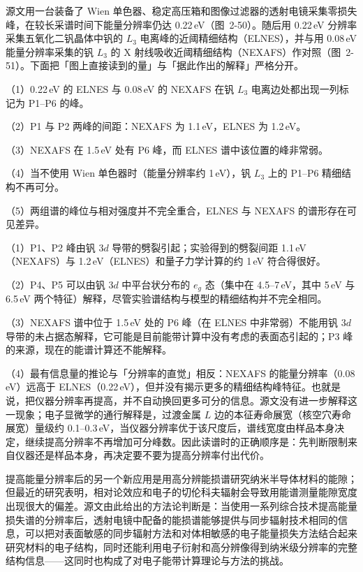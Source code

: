 \begin{example}
源文用一台装备了 Wien 单色器、稳定高压箱和图像过滤器的透射电镜采集零损失峰，在较长采谱时间下能量分辨率仍达 0.22\,eV（图~2-50）。随后用 0.22\,eV 分辨率采集五氧化二钒晶体中钒的 $L_3$ 电离峰的近阈精细结构（ELNES），并与用 0.08\,eV 能量分辨率采集的钒 $L_3$ 的 X 射线吸收近阈精细结构（NEXAFS）作对照（图~2-51）。下面把「图上直接读到的量」与「据此作出的解释」严格分开。

\begin{obs}
（1）0.22\,eV 的 ELNES 与 0.08\,eV 的 NEXAFS 在钒 $L_3$ 电离边处都出现一列标记为 P1--P6 的峰。

（2）P1 与 P2 两峰的间距：NEXAFS 为 1.1\,eV，ELNES 为 1.2\,eV。

（3）NEXAFS 在 1.5\,eV 处有 P6 峰，而 ELNES 谱中该位置的峰非常弱。

（4）当不使用 Wien 单色器时（能量分辨率约 1\,eV），钒 $L_3$ 上的 P1--P6 精细结构不再可分。

（5）两组谱的峰位与相对强度并不完全重合，ELNES 与 NEXAFS 的谱形存在可见差异。
\end{obs}

\begin{infer}
（1）P1、P2 峰由钒 $3d$ 导带的劈裂引起；实验得到的劈裂间距 1.1\,eV（NEXAFS）与 1.2\,eV（ELNES）和量子力学计算的约 1\,eV 符合得很好。

（2）P4、P5 可以由钒 $3d$ 中平台状分布的 $e_g$ 态（集中在 4.5--7\,eV，其中 5\,eV 与 6.5\,eV 两个特征）解释，尽管实验谱结构与模型的精细结构并不完全相同。

（3）NEXAFS 谱中位于 1.5\,eV 处的 P6 峰（在 ELNES 中非常弱）不能用钒 $3d$ 导带的未占据态解释，它可能是目前能带计算中没有考虑的表面态引起的；P3 峰的来源，现在的能谱计算还不能解释。

（4）最有信息量的推论与「分辨率的直觉」相反：NEXAFS 的能量分辨率（0.08\,eV）远高于 ELNES（0.22\,eV），但并没有揭示更多的精细结构峰特征。也就是说，把仪器分辨率再提高，并不自动换回更多可分的信息。源文没有进一步解释这一现象；电子显微学的通行解释是，过渡金属 $L$ 边的本征寿命展宽（核空穴寿命展宽）量级约 0.1--0.3\,eV，当仪器分辨率优于该尺度后，谱线宽度由样品本身决定，继续提高分辨率不再增加可分峰数。因此读谱时的正确顺序是：先判断限制来自仪器还是样品本身，再决定要不要为提高分辨率付出代价。
\end{infer}
\end{example}

提高能量分辨率后的另一个新应用是用高分辨能损谱研究纳米半导体材料的能隙；但最近的研究表明，相对论效应和电子的切伦科夫辐射会导致用能谱测量能隙宽度出现很大的偏差。源文由此给出的方法论判断是：当使用一系列综合技术提高能量损失谱的分辨率后，透射电镜中配备的能损谱能够提供与同步辐射技术相同的信息，可以把对表面敏感的同步辐射方法和对体相敏感的电子能量损失方法结合起来研究材料的电子结构，同时还能利用电子衍射和高分辨像得到纳米级分辨率的完整结构信息——这同时也构成了对电子能带计算理论与方法的挑战。


